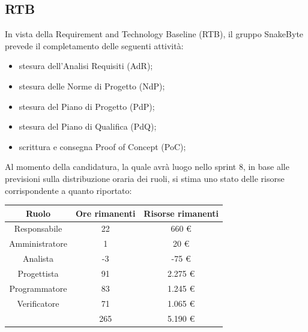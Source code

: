 \documentclass[10pt, letterpaper]{article}
\begin{document}
\subsection{RTB}
In vista della Requirement and Technology Baseline (RTB), il gruppo SnakeByte prevede il completamento delle seguenti attività:
\begin{itemize}
    \item stesura dell'Analisi Requisiti (AdR);
    \item stesura delle Norme di Progetto (NdP);
    \item stesura del Piano di Progetto (PdP);
    \item stesura del Piano di Qualifica (PdQ);
    \item scrittura e consegna Proof of Concept (PoC);
\end{itemize}
Al momento della candidatura, la quale avrà luogo nello sprint 8, in base alle previsioni sulla
distribuzione oraria dei ruoli, si stima uno stato delle risorse corrispondente a quanto riportato:
\begin{center}
    \begin{tabular}{|c|c|c|}
        \hline
        \rowcolor{lightgray} \textbf{Ruolo}    & \textbf{Ore rimanenti} & \textbf{Risorse rimanenti}
        \\
        \hline
        Responsabile                           & 22                     & 660 \euro                  \\
        \hline
        Amministratore                         & 1                      & 20 \euro                   \\
        \hline
        Analista                               & -3                     & -75 \euro                  \\
        \hline
        Progettista                            & 91                     & 2.275 \euro                \\
        \hline
        Programmatore                          & 83                     & 1.245 \euro                \\
        \hline
        Verificatore                           & 71                     & 1.065 \euro                \\
        \hline
        \cellcolor{lightgray}{\textbf{Totale}} & 265                    & 5.190 \euro                \\
        \hline
    \end{tabular}
\end{center}
\end{document}
